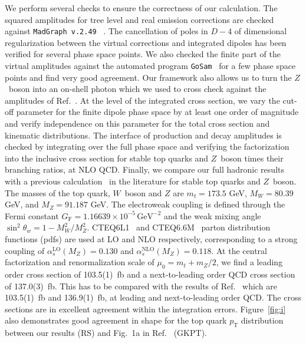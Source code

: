 \documentclass{JHEP3}
\newcommand{\GeV}{\mathrm{GeV}}
\begin{document}
We perform several checks to ensure the correctness of our calculation. 
The squared amplitudes for tree level and real emission corrections are checked against {\tt MadGraph v.2.49} ~\cite{Stelzer:1994ta}. 
The cancellation of poles in $D-4$ of dimensional regularization between the virtual corrections and integrated dipoles has been verified for several phase space points.
We also checked the finite part of the virtual amplitudes against the automated program {\tt GoSam}~\cite{Cullen:2011ac} for a few phase space points and find
very good agreement. 
Our framework also allows us 
to turn the $Z$~boson into an on-shell photon which we used to cross check against the amplitudes of Ref.~\cite{Melnikov:2011ta}. 
At the level of the integrated cross section, we vary the cut-off parameter for the finite dipole phase space by at least one order of magnitude and 
verify independence on this parameter for the total cross section and kinematic distributions.
The interface of production and decay amplitudes is checked by integrating over the full phase space and verifying the factorization into the 
inclusive cross section for stable top quarks and $Z$~boson times their branching ratios, at NLO QCD.
Finally, we compare our full hadronic results with a previous calculation~\cite{Garzelli:2012bn} in the literature for stable top quarks and $Z$~boson.
The masses of the top quark, $W$~boson and $Z$ are $m_t=173.5$ GeV, $M_W=80.39$ GeV, and $M_Z=91.187$ GeV. 
The electroweak coupling is defined through the Fermi constant $G_\mathrm{F}=1.16639 \times 10^{-5} \, \GeV^{-2}$ and the weak mixing angle $\sin^2\theta_w = 1-M_W^2/M_Z^2$. 
CTEQ6L1~\cite{Pumplin:2002vw} and CTEQ6.6M~\cite{Nadolsky:2008zw} parton distribution functions (pdfs) are used at LO and NLO respectively, corresponding to a strong coupling of $\alpha_s^{\mathrm{LO}}(M_Z)=0.130$ and $\alpha_s^{\mathrm{NLO}}(M_Z)=0.118$. 
At the central factorization and renormalization scale of $\mu_0=m_t+m_Z/2$, 
we find a leading order cross section of 103.5(1)~fb and a next-to-leading order QCD cross section of 137.0(3)~fb. 
This has to be compared with the results of Ref.~\cite{Garzelli:2012bn} which are 103.5(1)~fb and 136.9(1)~fb, at leading and next-to-leading order QCD.
The cross sections are in excellent agreement within the integration errors.
Figure~\ref{fig:i} also demonstrates good agreement in shape for the top quark $p_{\mathrm{T}}$ distribution between our results (RS) and Fig.~1a in Ref.~\cite{Garzelli:2012bn} (GKPT).
\end{document}

